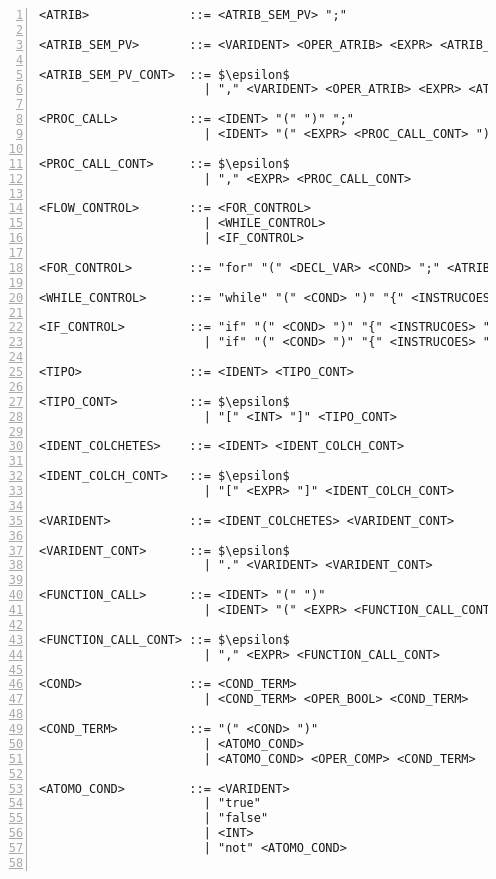 \begin{lstlisting}[frame=single,numbers=left,breaklines=true,mathescape=true>,basicstyle=\ttfamily\scriptsize]
<ATRIB>              ::= <ATRIB_SEM_PV> ";"

<ATRIB_SEM_PV>       ::= <VARIDENT> <OPER_ATRIB> <EXPR> <ATRIB_SEM_PV_CONT>

<ATRIB_SEM_PV_CONT>  ::= $\epsilon$
                       | "," <VARIDENT> <OPER_ATRIB> <EXPR> <ATRIB_SEM_PV_CONT>

<PROC_CALL>          ::= <IDENT> "(" ")" ";"
                       | <IDENT> "(" <EXPR> <PROC_CALL_CONT> ")" ";"

<PROC_CALL_CONT>     ::= $\epsilon$
                       | "," <EXPR> <PROC_CALL_CONT>

<FLOW_CONTROL>       ::= <FOR_CONTROL>
                       | <WHILE_CONTROL>
                       | <IF_CONTROL>

<FOR_CONTROL>        ::= "for" "(" <DECL_VAR> <COND> ";" <ATRIB_SEM_PV> ")" "{" <INSTRUCOES> "}"

<WHILE_CONTROL>      ::= "while" "(" <COND> ")" "{" <INSTRUCOES> "}"

<IF_CONTROL>         ::= "if" "(" <COND> ")" "{" <INSTRUCOES> "}"
                       | "if" "(" <COND> ")" "{" <INSTRUCOES> "}" "else" "{" <INSTRUCOES> "}"

<TIPO>               ::= <IDENT> <TIPO_CONT>

<TIPO_CONT>          ::= $\epsilon$
                       | "[" <INT> "]" <TIPO_CONT>

<IDENT_COLCHETES>    ::= <IDENT> <IDENT_COLCH_CONT>

<IDENT_COLCH_CONT>   ::= $\epsilon$
                       | "[" <EXPR> "]" <IDENT_COLCH_CONT>

<VARIDENT>           ::= <IDENT_COLCHETES> <VARIDENT_CONT>

<VARIDENT_CONT>      ::= $\epsilon$
                       | "." <VARIDENT> <VARIDENT_CONT>

<FUNCTION_CALL>      ::= <IDENT> "(" ")"
                       | <IDENT> "(" <EXPR> <FUNCTION_CALL_CONT> ")"

<FUNCTION_CALL_CONT> ::= $\epsilon$
                       | "," <EXPR> <FUNCTION_CALL_CONT>

<COND>               ::= <COND_TERM> 
                       | <COND_TERM> <OPER_BOOL> <COND_TERM>

<COND_TERM>          ::= "(" <COND> ")" 
                       | <ATOMO_COND> 
                       | <ATOMO_COND> <OPER_COMP> <COND_TERM>

<ATOMO_COND>         ::= <VARIDENT> 
                       | "true"
                       | "false"
                       | <INT> 
                       | "not" <ATOMO_COND>


\end{lstlisting}
